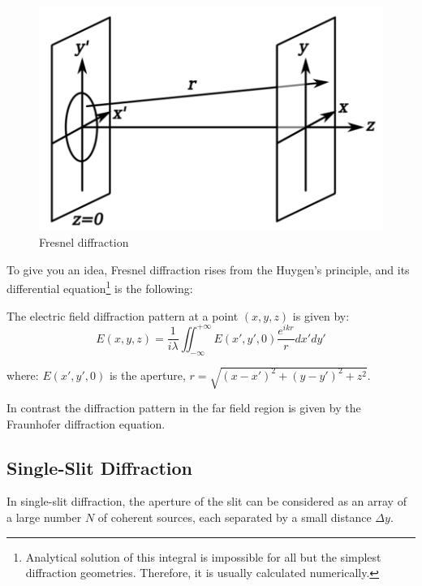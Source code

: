 \documentclass[UTF8]{book}
\begin{document}
\begin{figure}[H]
\centering
\label{fig:Fresnel diffraction}
\includegraphics[scale=0.6]{Figure/24.PNG}
\caption{Fresnel diffraction}
\end{figure}

To give you an idea, Fresnel diffraction rises from the Huygen's principle, and its differential equation\footnote{Analytical solution of this integral is impossible for all but the simplest diffraction geometries. Therefore, it is usually calculated numerically.} is the following:

The electric field diffraction pattern at a point $(x, y, z)$ is given by:
\[{\displaystyle E\left(x,y,z\right)={\frac {1}{i\lambda }}\iint _{-\infty }^{+\infty }{E\left(x',y',0\right){\frac {e^{ikr}}{r}}}dx'dy'}\]

where: $E(x',y',0)$ is the aperture, $r =\sqrt{(x-x')^2+(y-y')^2+z^2}$.

In contrast the diffraction pattern in the far field region is given by the Fraunhofer diffraction equation.
\subsection{Single-Slit Diffraction}
In single-slit diffraction, the aperture of the slit can be considered as an array of a large number $N$ of coherent sources, each separated by a small distance $\Delta y$.
\end{document}
